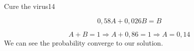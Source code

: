 \begin{questions}
\begin{question}{Cure the virus}{14}
\begin{answer}
\begin{enumerate}
				\begin{equation}
				0,58A + 0,026B = B
		\end{equation}
				
		\begin{equation}
				A + B = 1 \Rightarrow  A + 0,86 = 1 \Rightarrow  A = 0,14
		\end{equation}
		We can see the probability converge to our solution.
		\end{enumerate}
	\end{answer}	
	\end{question}	
\end{questions}

